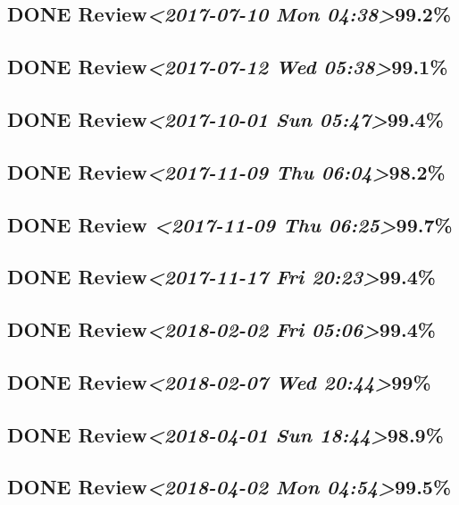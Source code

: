 \documentclass[11pt]{ctexart}
\begin{document}
\subsection{{\bfseries\sffamily DONE} Review\textit{<2017-07-10 Mon 04:38>}99.2\%}
\label{sec:org8ca4f70}
\subsection{{\bfseries\sffamily DONE} Review\textit{<2017-07-12 Wed 05:38>}99.1\%}
\label{sec:org12d15a0}
\subsection{{\bfseries\sffamily DONE} Review\textit{<2017-10-01 Sun 05:47>}99.4\%}
\label{sec:org82703c5}

\subsection{{\bfseries\sffamily DONE} Review\textit{<2017-11-09 Thu 06:04>}98.2\%}
\label{sec:orgd3d41ad}
\subsection{{\bfseries\sffamily DONE} Review \textit{<2017-11-09 Thu 06:25>}99.7\%}
\label{sec:org1b997d9}
\subsection{{\bfseries\sffamily DONE} Review\textit{<2017-11-17 Fri 20:23>}99.4\%}
\label{sec:org3c5c001}
\subsection{{\bfseries\sffamily DONE} Review\textit{<2018-02-02 Fri 05:06>}99.4\%}
\label{sec:org6317220}
\subsection{{\bfseries\sffamily DONE} Review\textit{<2018-02-07 Wed 20:44>}99\%}
\label{sec:org03b21b6}
\subsection{{\bfseries\sffamily DONE} Review\textit{<2018-04-01 Sun 18:44>}98.9\%}
\label{sec:org455bdd6}
\subsection{{\bfseries\sffamily DONE} Review\textit{<2018-04-02 Mon 04:54>}99.5\%}
\label{sec:orga754d9c}
\end{document}
